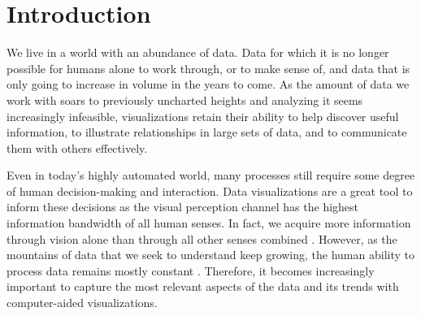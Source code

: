 \chapter{Introduction}
\label{chap:introduction}

We live in a world with an abundance of data.
Data for which it is no longer possible for humans alone to work through, or to make sense of, and data that is only going to increase in volume in the years to come.
As the amount of data we work with soars to previously uncharted heights and analyzing it seems increasingly infeasible, visualizations retain their ability to help discover useful information, to illustrate relationships in large sets of data, and to communicate them with others effectively.

Even in today's highly automated world, many processes still require some degree of human decision-making and interaction.
Data visualizations are a great tool to inform these decisions as the visual perception channel has the highest information bandwidth of all human senses.
In fact, we acquire more information through vision alone than through all other senses combined \cite{ware2019information}.
However, as the mountains of data that we seek to understand keep growing, the human ability to process data remains mostly constant \cite{dachsbacher2019visualisierung}.
Therefore, it becomes increasingly important to capture the most relevant aspects of the data and its trends with computer-aided visualizations.





